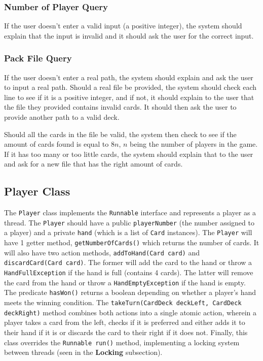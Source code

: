 \documentclass[a4paper, 11pt] {article}
\begin{document}
\subsubsection*{Number of Player Query}
If the user doesn't enter a valid input (a positive integer), the system should explain that the input is invalid and it should ask the user for the correct input.
\subsubsection*{Pack File Query}
If the user doesn't enter a real path, the system should explain and ask the user to input a real path.
Should a real file be provided, the system should check each line to see if it is a positive integer, and if not, it should explain to the user that the file they provided contains invalid cards. It should then ask the user to provide another path to a valid deck.

Should all the cards in the file be valid, the system then check to see if the amount of cards found is equal to $8n$, $n$ being the number of players in the game. If it has too many or too little cards, the system should explain that to the user and ask for a new file that has the right amount of cards.
\subsection*{Player Class}
The \texttt{Player} class implements the \texttt{Runnable} interface and represents a player as a thread. 
The \texttt{Player} should have a public \texttt{playerNumber} (the number assigned to a player) and a private \texttt{hand} (which is a list of \texttt{Card} instances). 
The \texttt{Player} will have 1 getter method, \texttt{getNumberOfCards()} which returns the number of cards. 
It will also have two action methods, \texttt{addToHand(Card card)} and \texttt{discardCard(Card card)}. The former will add the card to the hand or throw a \texttt{HandFullException} if the hand is full (contains 4 cards). The latter will remove the card from the hand or throw a \texttt{HandEmptyException} if the hand is empty. 
The predicate \texttt{hasWon()} returns a boolean depending on whether a player's hand meets the winning condition. 
The \texttt{takeTurn(CardDeck deckLeft, CardDeck deckRight)} method combines both actions into a single atomic action, wherein a player takes a card from the left, checks if it is preferred and either adds it to their hand if it is or discards the card to their right if it does not. 
Finally, this class overrides the \texttt{Runnable run()} method, implementing a locking system between threads (seen in the \textbf{Locking} subsection).
\end{document}
